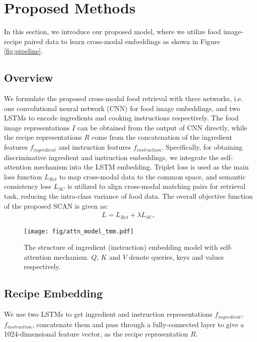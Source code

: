 \documentclass[journal]{IEEEtran}
\begin{document}
\section{Proposed Methods}
In this section, we introduce our proposed model, where we utilize food image-recipe paired data to learn cross-modal embeddings as shown in Figure \ref{fig:pipeline}.

\subsection{Overview}
We formulate the proposed cross-modal food retrieval with three networks, i.e. one convolutional neural network (CNN) for food image embeddings, and two LSTMs to encode ingredients and cooking instructions respectively. The food image representations $I$ can be obtained from the output of CNN directly, while the recipe representations $R$ come from the concatenation of the ingredient features $f_{ingredient}$ and instruction features $f_{instruction}$. 
Specifically, for obtaining discriminative ingredient and instruction embeddings, we integrate the self-attention mechanism \cite{vaswani2017attention} into the LSTM embedding. 
Triplet loss is used as the main loss function $L_{Ret}$ to map cross-modal data to the common space, and semantic consistency loss $L_{SC}$ is utilized to align cross-modal matching pairs for retrieval task, reducing the intra-class variance of food data. The overall objective function of the proposed SCAN is given as:
\begin{equation}
\begin{aligned}
L = L_{Ret} + \lambda L_{SC},
\label{total_eq}
\end{aligned}
\end{equation}

\begin{figure}
\begin{center}
\texttt{[image: fig/attn\_model\_tmm.pdf]}
\end{center}
   \caption{The structure of ingredient (instruction) embedding model with self-attention mechanism. $Q$, $K$ and $V$ denote queries, keys and values respectively.}
\label{fig:attn_model}
\end{figure}

\subsection{Recipe Embedding}
We use two LSTMs to get ingredient and instruction representations $f_{ingredient}$, $f_{instruction}$, concatenate them and pass through a fully-connected layer to give a 1024-dimensional feature vector, as the recipe representation $R$.
\end{document}
